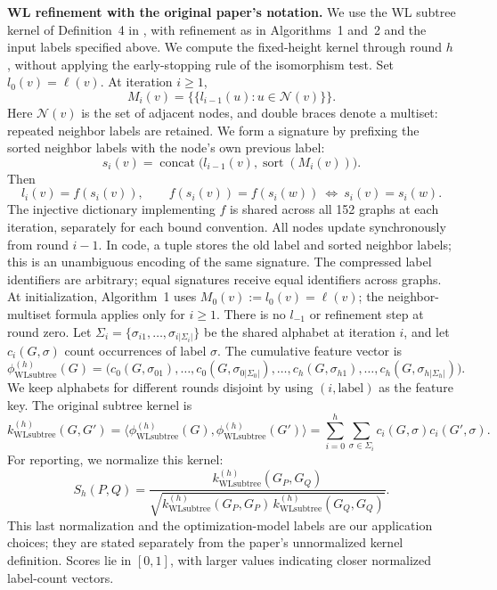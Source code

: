 \documentclass[10pt]{article}
\newcommand{\WL}{\mathrm{WLsubtree}}
\begin{document}
\medskip
\textbf{WL refinement with the original paper's notation.}
We use the WL subtree kernel of Definition~4 in
\citet{Shervashidze2011}, with refinement as in Algorithms~1 and~2
and the input labels specified above. We compute the fixed-height
kernel through round $h$, without applying the early-stopping rule
of the isomorphism test.
Set $l_0(v)=\ell(v)$. At iteration $i\geq1$,
\[
 M_i(v)=\{\!\{l_{i-1}(u):u\in\mathcal N(v)\}\!\}.
\]
Here $\mathcal N(v)$ is the set of adjacent nodes, and double braces
denote a multiset: repeated neighbor labels are retained.
We form a signature by prefixing the sorted neighbor labels with the
node's own previous label:
\[
s_i(v)=\operatorname{concat}
\big(l_{i-1}(v),\operatorname{sort}(M_i(v))\big).
\]
Then
\[
 l_i(v)=f(s_i(v)),\qquad
 f(s_i(v))=f(s_i(w))\ \Longleftrightarrow\ s_i(v)=s_i(w).
\]
The injective dictionary implementing $f$ is shared across all 152 graphs
at each iteration, separately for each bound convention.
All nodes update synchronously from round $i-1$.
In code, a tuple stores the old label and sorted neighbor
labels; this is an unambiguous encoding of the same signature.
The compressed label identifiers are arbitrary; equal signatures receive
equal identifiers across graphs. At initialization, Algorithm~1 uses
$M_0(v):=l_0(v)=\ell(v)$; the neighbor-multiset formula applies only for
$i\geq1$. There is no $l_{-1}$ or refinement step at round zero.
Let $\Sigma_i=\{\sigma_{i1},\ldots,\sigma_{i|\Sigma_i|}\}$ be the shared
alphabet at iteration $i$, and let $c_i(G,\sigma)$ count occurrences of
label $\sigma$. The cumulative feature vector is
\[
\phi^{(h)}_{\WL}(G)=
\big(c_0(G,\sigma_{01}),\ldots,c_0(G,\sigma_{0|\Sigma_0|}),
\ldots,c_h(G,\sigma_{h1}),\ldots,c_h(G,\sigma_{h|\Sigma_h|})\big).
\]
We keep alphabets for different rounds disjoint by using
$(i,\text{label})$ as the feature key. The original subtree kernel is
\[
 k^{(h)}_{\WL}(G,G')=
 \langle\phi^{(h)}_{\WL}(G),\phi^{(h)}_{\WL}(G')\rangle
 =\sum_{i=0}^{h}\sum_{\sigma\in\Sigma_i}
 c_i(G,\sigma)c_i(G',\sigma).
\]
For reporting, we normalize this kernel:
\[
 S_h(P,Q)=
 \frac{k^{(h)}_{\WL}(G_P,G_Q)}
 {\sqrt{k^{(h)}_{\WL}(G_P,G_P)\,k^{(h)}_{\WL}(G_Q,G_Q)}}.
\]
This last normalization and the optimization-model labels are our
application choices; they are stated separately from the paper's
unnormalized kernel definition. Scores lie in $[0,1]$, with larger
values indicating closer normalized label-count vectors.
\end{document}

